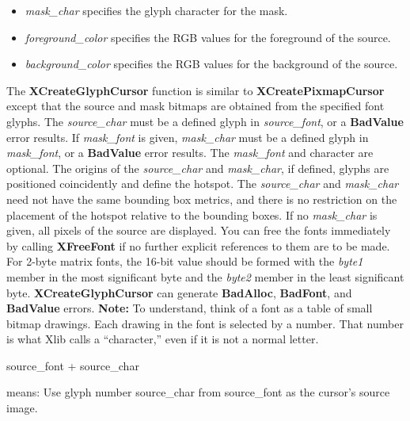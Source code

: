 \documentclass{report}
\begin{document}
\begin{itemize}
\begin{itemize}
                \item \textit{mask\_char} specifies the glyph character for the mask.
                \item \textit{foreground\_color} specifies the RGB values for the foreground of the source.
                \item \textit{background\_color} specifies the RGB values for the background of the source.
            \end{itemize}
            \bigbreak \noindent
            The \textbf{XCreateGlyphCursor} function is similar to \textbf{XCreatePixmapCursor} except that the source and mask bitmaps are obtained from the specified font glyphs. The \textit{source\_char} must be a defined glyph in \textit{source\_font}, or a \textbf{BadValue} error results. If \textit{mask\_font} is given, \textit{mask\_char} must be a defined glyph in \textit{mask\_font}, or a \textbf{BadValue} error results. The \textit{mask\_font} and character are optional. The origins of the \textit{source\_char} and \textit{mask\_char}, if defined, glyphs are positioned coincidently and define the hotspot. The \textit{source\_char} and \textit{mask\_char} need not have the same bounding box metrics, and there is no restriction on the placement of the hotspot relative to the bounding boxes. If no \textit{mask\_char} is given, all pixels of the source are displayed. You can free the fonts immediately by calling \textbf{XFreeFont} if no further explicit references to them are to be made.
            \bigbreak \noindent
            For 2-byte matrix fonts, the 16-bit value should be formed with the \textit{byte1} member in the most significant byte and the \textit{byte2} member in the least significant byte.
            \bigbreak \noindent
            \textbf{XCreateGlyphCursor} can generate \textbf{BadAlloc}, \textbf{BadFont}, and \textbf{BadValue} errors.
            \bigbreak \noindent 
            \textbf{Note:} To understand, think of a font as a table of small bitmap drawings. Each drawing in the font is selected by a number. That number is what Xlib calls a “character,” even if it is not a normal letter.
            \bigbreak \noindent 
            \begin{cppcode}
            source_font + source_char
            \end{cppcode}
            \bigbreak \noindent 
            means: Use glyph number source\_char from source\_font as the cursor’s source image.
            \bigbreak \noindent 
            \begin{cppcode}

\end{cppcode}
\end{itemize}
\end{document}
